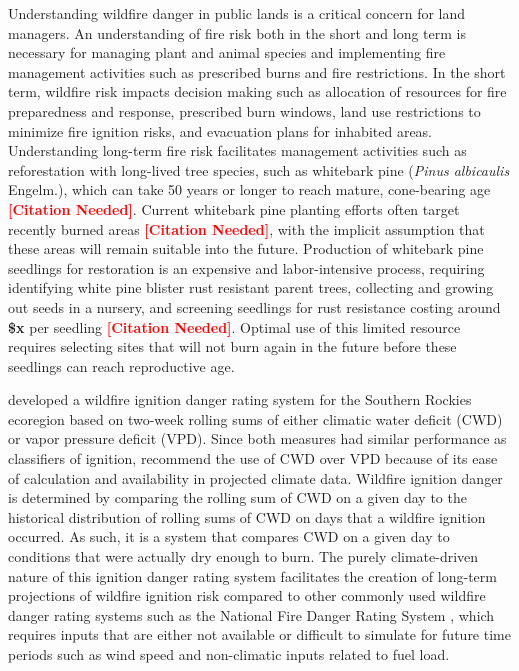 \documentclass[11pt]{article}
\newcommand{\citethis}{\textbf{\textcolor{red}{[Citation Needed]}}}
\begin{document}
Understanding wildfire danger in public lands is a critical concern for land managers.  An understanding of fire risk both in the short and long term is necessary for managing plant and animal species and implementing fire management activities such as prescribed burns and fire restrictions. In the short term, wildfire risk impacts decision making such as allocation of resources for fire preparedness and response, prescribed burn windows, land use restrictions to minimize fire ignition risks, and evacuation plans for inhabited areas.  Understanding long-term fire risk facilitates management activities such as reforestation with long-lived tree species, such as whitebark pine (\textit{Pinus albicaulis} Engelm.), which can take 50 years or longer to reach mature, cone-bearing age \citethis. Current whitebark pine planting efforts often target recently burned areas \citethis, with the implicit assumption that these areas will remain suitable into the future. Production of whitebark pine seedlings for restoration is an expensive and labor-intensive process, requiring identifying white pine blister rust resistant parent trees, collecting and growing out seeds in a nursery, and screening seedlings for rust resistance costing around \textbf{\$x} per seedling \citethis.  Optimal use of this limited resource requires selecting sites that will not burn again in the future before these seedlings can reach reproductive age. 

\citet{thomaWaterBalanceIndicator2020} developed a wildfire ignition danger rating system for the Southern Rockies ecoregion \citep{omernikEcoregionsConterminousUnited1987} based on two-week rolling sums of either climatic water deficit (CWD) or vapor pressure deficit (VPD). Since both measures had similar performance as classifiers of ignition, \citet{thomaWaterBalanceIndicator2020} recommend the use of CWD over VPD because of its ease of calculation and availability in projected climate data.  Wildfire ignition danger is determined by comparing the rolling sum of CWD on a given day to the historical distribution of rolling sums of CWD on days that a wildfire ignition occurred. As such, it is a system that compares CWD on a given day to conditions that were actually dry enough to burn. The purely climate-driven nature of this ignition danger rating system facilitates the creation of long-term projections of wildfire ignition risk compared to other commonly used wildfire danger rating systems such as the National Fire Danger Rating System \citep{degrootChapter11Wildland2015}, which requires inputs that are either not available or difficult to simulate for future time periods such as wind speed and non-climatic inputs related to fuel load.  
\end{document}
